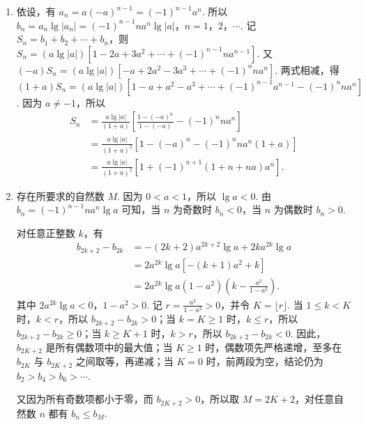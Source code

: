 \documentclass[UTF8,a4paper,oneside,11pt]{ctexbook}
\begin{document}
\begin{solution}
\begin{enumerate}
\item 依设，有 \(a_{n}=a(-a)^{n-1}=(-1)^{n-1}a^{n}\). 所以 \(b_n = a_n \lg |a_n| = (-1)^{n-1}na^n \lg |a|\)，\(n=1\)，\(2\)，\(\cdots\). 记 \(S_n = b_1 + b_2 + \cdots + b_n\)，则
\(S_n = \left(a \lg |a| \right) \left[ 1 - 2a + 3a^2 + \cdots + (-1)^{n-1} na^{n-1} \right]\).
又
\((-a) S_n = \left(a \lg |a| \right) \left[ -a + 2a^2 - 3a^3 + \cdots + (-1)^n na^n \right]\).
两式相减，得
\((1 + a) S_n = \left(a \lg |a| \right) \left[ 1 - a + a^2 - a^3 + \cdots + (-1)^{n-1} a^{n-1} - (-1)^n na^n \right]\).
因为 \(a\neq-1\)，所以
\[
\begin{aligned}
S_{n}
&=\frac{a\lg\left|a\right|}{\left(1+a\right)}\left[\frac{1-\left(-a\right)^{n}}{1-\left(-a\right)}-\left(-1\right)^{n}na^{n}\right]\\
&=\frac{a\lg\left|a\right|}{\left(1+a\right)^{2}}\left[1-\left(-a\right)^{n}-\left(-1\right)^{n}na^{n}\left(1+a\right)\right]\\
&=\frac{a\lg\left|a\right|}{\left(1+a\right)^{2}}\left[1+\left(-1\right)^{n+1}\left(1+n+na\right)a^{n}\right].
\end{aligned}
\]

\item 存在所要求的自然数 \(M\). 因为 \(0<a<1\)，所以 \(\lg a<0\). 由 \(b_n=(-1)^{n-1}na^n\lg a\) 可知，当 \(n\) 为奇数时 \(b_n<0\)，当 \(n\) 为偶数时 \(b_n>0\).

对任意正整数 \(k\)，有
\[
\begin{aligned}
b_{2k+2} - b_{2k}
&=-(2k+2)a^{2k+2}\lg a+2ka^{2k}\lg a\\
&=2a^{2k}\lg a\left[-(k+1)a^{2}+k\right]\\
&=2a^{2k}\lg a\left(1-a^{2}\right)\left(k-\frac{a^{2}}{1-a^{2}}\right).
\end{aligned}
\]
其中 \(2a^{2k}\lg a<0\)，\(1-a^{2}>0\). 记 \(r=\frac{a^{2}}{1-a^{2}}>0\)，并令 \(K=\lfloor r\rfloor\). 当 \(1\leqslant k<K\) 时，\(k<r\)，所以 \(b_{2k+2}-b_{2k}>0\)；当 \(k=K\geqslant1\) 时，\(k\leqslant r\)，所以 \(b_{2k+2}-b_{2k}\geqslant0\)；当 \(k\geqslant K+1\) 时，\(k>r\)，所以 \(b_{2k+2}-b_{2k}<0\). 因此，\(b_{2K+2}\) 是所有偶数项中的最大值；当 \(K\geqslant1\) 时，偶数项先严格递增，至多在 \(b_{2K}\) 与 \(b_{2K+2}\) 之间取等，再递减；当 \(K=0\) 时，前两段为空，结论仍为 \(b_2>b_4>b_6>\cdots\).

又因为所有奇数项都小于零，而 \(b_{2K+2}>0\)，所以取 \(M=2K+2\)，对任意自然数 \(n\) 都有 \(b_n\leqslant b_M\).
\end{enumerate}
\end{solution}

\end{document}
